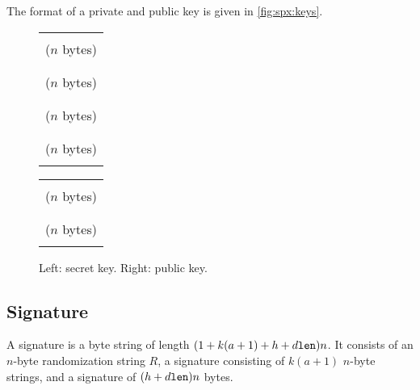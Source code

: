     The format of a \spx private and public key is given in \autoref{fig:spx:keys}.

\begin{figure} [h]
  \begin{center}
  \begin{minipage}{.4\textwidth}
        \begin{center}
	  \begin{tabular}{|c|}
	    \hline
	    \\[-0.5em] \sseed ($n$ bytes) \\[-0.5em] \\ \hline
	    \\[-0.5em] \skprf ($n$ bytes) \\[-0.5em] \\ \hline
	    \\[-0.5em] \pseed ($n$ bytes) \\[-0.5em] \\ \hline
	    \\[-0.5em] \proot ($n$ bytes) \\[-0.5em] \\ \hline
	  \end{tabular}
        \end{center}
      \end{minipage}
  \begin{minipage}{.4\textwidth}
      \begin{center}
	\begin{tabular}{|c|}
	    \hline
	    \\[-0.5em] \pseed ($n$ bytes) \\[-0.5em] \\ \hline
	    \\[-0.5em] \proot ($n$ bytes) \\[-0.5em] \\ \hline
	  \end{tabular}
        \end{center}
      \end{minipage}
  \end{center}
  \caption{Left: \spx secret key. Right: \spx public key.}
  \label{fig:spx:keys}
\end{figure}

\subsection{\spx Signature}

   A \spx signature \htsig is a byte string of length $(1 + k(a + 1) + h + d\texttt{len})n$.
   It consists of an $n$-byte randomization string $R$, a \fors signature
   \forssig consisting of $k(a+1)$ $n$-byte strings, and a \hyper signature \htsig
   of $(h + d\texttt{len})n$ bytes.

